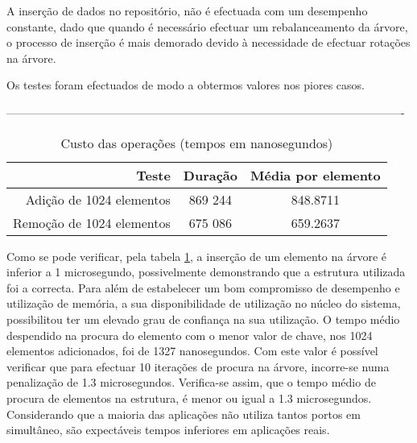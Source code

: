 A inserção de dados no repositório, não é efectuada com um desempenho constante, dado que quando é necessário efectuar um rebalanceamento da árvore, o processo de inserção é mais demorado devido à necessidade de efectuar rotações na árvore.

Os testes foram efectuados de modo a obtermos valores nos piores casos.

----------------------------------------------------------------------------------------------------------
 
\begin{table}[!htb]
\begin{center}
\caption{Custo das operações (tempos em nanosegundos)}
\begin{tabular}{ | r | c | c | }
\hline
\hspace{1cm} Teste \hspace{1.5cm} & \hspace{1cm}Duração\hspace{1cm} &  Média por
elemento \\
\hline
Adição de 1024 elementos & 869 244 & 848.8711 \\
\hline
Remoção de 1024 elementos & 675 086 & 659.2637\\
\hline

\hline
\end{tabular}
\label{tab:tree_info}
\end{center}
\end{table}

Como se pode verificar, pela tabela \ref{tab:tree_info}, a inserção de um elemento na árvore é inferior a 1 microsegundo, possivelmente demonstrando que a estrutura utilizada foi a correcta.
Para além de estabelecer um bom compromisso de desempenho e utilização de memória, a sua disponibilidade de utilização no núcleo do sistema, possibilitou ter um elevado grau de confiança na sua utilização.
O tempo médio despendido na procura do elemento com o menor valor de chave, nos 1024 elementos adicionados, foi de 1327 nanosegundos.
Com este valor é possível verificar que para efectuar 10 iterações de procura na árvore, incorre-se numa penalização de 1.3 microsegundos.
Verifica-se assim, que o tempo médio de procura de elementos na estrutura, é menor ou igual a 1.3 microsegundos.
Considerando que a maioria das aplicações não utiliza tantos portos em simultâneo, são expectáveis tempos inferiores em aplicações reais.


